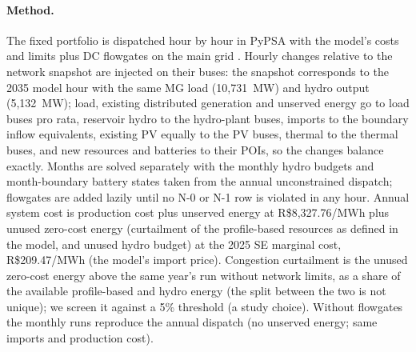 \documentclass[10pt]{article}
\newcommand{\RS}{R\$}
\begin{document}
\paragraph{Method.} The fixed portfolio is dispatched hour by hour in PyPSA with the model's costs and limits plus DC flowgates on the main
grid \citep{course_l9}. Hourly changes relative to the network snapshot are injected on their buses: the snapshot corresponds to the 2035
model hour with the same MG load (10,731~MW) and hydro output (5,132~MW); load, existing distributed generation and unserved energy go to
load buses pro rata, reservoir hydro to the hydro-plant buses, imports to the boundary inflow equivalents, existing PV equally to the PV buses,
thermal to the thermal buses, and new resources and batteries to their POIs, so the changes balance exactly. Months are solved separately
with the monthly hydro budgets and month-boundary battery states taken from the annual unconstrained dispatch; flowgates are added lazily
until no N-0 or N-1 row is violated in any hour. Annual system cost is production cost plus unserved energy at \RS8,327.76/MWh
\citep{ccee2025deficit} plus unused zero-cost energy (curtailment of the profile-based resources as defined in the model, and unused hydro budget) at the 2025
SE marginal cost, \RS209.47/MWh (the model's import price). Congestion curtailment is the unused zero-cost energy above the same year's run
without network limits, as a share of the available profile-based and hydro energy (the split between the two is not unique); we
screen it against a 5\% threshold (a study choice).
Without flowgates the monthly runs reproduce the annual dispatch (no unserved energy; same imports and production cost).


\end{document}

